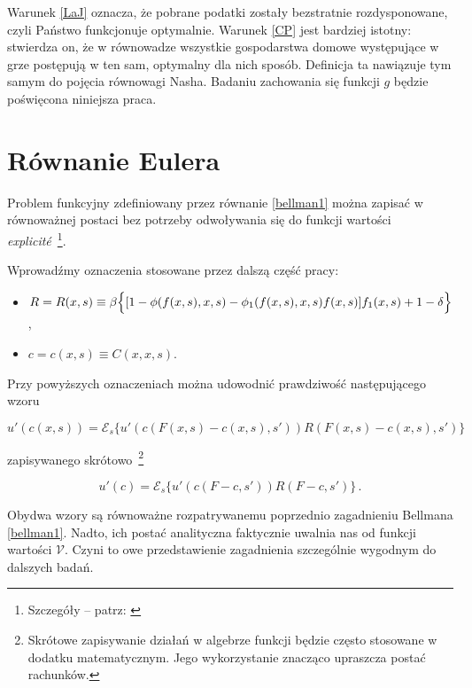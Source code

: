 Warunek \ref{LaJ} oznacza, że pobrane podatki zostały bezstratnie rozdysponowane, czyli Państwo funkcjonuje optymalnie. Warunek \ref{CP} jest bardziej istotny: stwierdza on, że w równowadze wszystkie gospodarstwa domowe występujące w grze postępują w ten sam, optymalny dla nich sposób. Definicja ta nawiązuje tym samym do pojęcia równowagi Nasha. Badaniu zachowania się funkcji $ g $ będzie poświęcona niniejsza praca. 




\section{Równanie Eulera}\label{chap_Euler}

Problem funkcyjny zdefiniowany przez równanie \ref{bellman1} można zapisać w równoważnej postaci bez potrzeby odwoływania się do funkcji wartości {\it explicit\'e}~\footnote{Szczegóły -- patrz: \citet[][rozdz. 9.5, str. 280-283]{Prescott}}.
		
Wprowadźmy oznaczenia stosowane przez dalszą część pracy:

\begin{itemize}
		\item{ $R = R(x,s) \equiv \beta \Bigl \{[1 - \phi(f(x,s),x,s) - \phi_1 (f(x,s),x,s)f(x,s)]f_1 (x,s) + 1 - \delta \Bigl \} $,}
		\item{ $c = c(x,s) \equiv C(x,x,s) $.}
\end{itemize}

Przy powyższych oznaczeniach można udowodnić prawdziwość następującego wzoru 

\begin{equation}
u'(c(x,s)) =   \mathcal{E}_s \bigl \{ u'(c(F(x,s)-c(x,s),s'))R(F(x,s)-c(x,s),s')	\bigl \} 
\end{equation}

zapisywanego skrótowo~\footnote{Skrótowe zapisywanie działań w algebrze funkcji będzie często stosowane w dodatku matematycznym. Jego wykorzystanie znacząco upraszcza postać rachunków.}

\begin{equation}\label{Euler_easy}
u'(c) =   \mathcal{E}_s \bigl \{ u'(c(F-c, s'))R(F-c,s')	\bigl \}\,. 
\end{equation}

Obydwa wzory są równoważne rozpatrywanemu poprzednio zagadnieniu Bellmana \ref{bellman1}. Nadto, ich postać analityczna faktycznie uwalnia nas od funkcji wartości $\mathcal{V}$. Czyni to owe przedstawienie zagadnienia szczególnie wygodnym do dalszych badań.  

